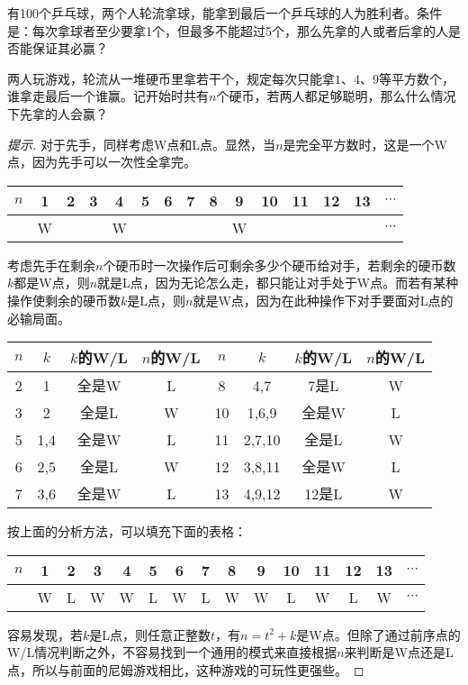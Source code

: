 \begin{question}
  有100个乒乓球，两个人轮流拿球，能拿到最后一个乒乓球的人为胜利者。条件是：每次拿球者至少要拿1个，但最多不能超过5个，那么先拿的人或者后拿的人是否能保证其必赢？
\end{question}

\begin{example}[拿平方数]
  两人玩游戏，轮流从一堆硬币里拿若干个，规定每次只能拿$1$、$4$、$9$等平方数个，谁拿走最后一个谁赢。记开始时共有$n$个硬币，若两人都足够聪明，那么什么情况下先拿的人会赢？
\end{example}
\begin{proof}[提示]
  对于先手，同样考虑W点和L点。显然，当$n$是完全平方数时，这是一个W点，因为先手可以一次性全拿完。
  \begin{center}
    \begin{tabular}{c|cccccccccccccc}
      \toprule
      $n$ & 1 & 2 & 3 & 4 & 5 & 6 & 7 & 8 & 9 & 10 & 11 & 12 & 13 & $\cdots$ \\\hline
          & W &   &   & W &   &   &   &   & W &    &    &    &    & $\cdots$ \\
      \bottomrule
    \end{tabular}
  \end{center}
  考虑先手在剩余$n$个硬币时一次操作后可剩余多少个硬币给对手，若剩余的硬币数$k$都是W点，则$n$就是L点，因为无论怎么走，都只能让对手处于W点。而若有某种操作使剩余的硬币数$k$是L点，则$n$就是W点，因为在此种操作下对手要面对L点的必输局面。
  \begin{center}
    \begin{tabular}{cc|cc||cc|cc}
      \toprule
      $n$ & $k$ & $k$的W/L & $n$的W/L & $n$ & $k$ & $k$的W/L & $n$的W/L\\\hline
      2   & 1   & 全是W    & L        & 8   & 4,7 & 7是L     & W\\
      3   & 2   & 全是L    & W        & 10  & 1,6,9  & 全是W    & L\\
      5   & 1,4 & 全是W    & L        & 11  & 2,7,10 & 全是L    & W\\
      6   & 2,5 & 全是L    & W        & 12  & 3,8,11 & 全是W    & L\\
      7   & 3,6 & 全是W    & L        & 13  & 4,9,12 & 12是L    & W\\
      \bottomrule
    \end{tabular}
  \end{center}
  按上面的分析方法，可以填充下面的表格：
  \begin{center}
    \begin{tabular}{c|cccccccccccccc}
      \toprule
      $n$ & 1 & 2 & 3 & 4 & 5 & 6 & 7 & 8 & 9 & 10 & 11 & 12 & 13 & $\cdots$ \\\hline
          & W & L & W & W & L & W & L & W & W & L  & W  & L  & W  & $\cdots$ \\
      \bottomrule
    \end{tabular}
  \end{center}
  容易发现，若$k$是L点，则任意正整数$t$，有$n=t^2+k$是W点。但除了通过前序点的W/L情况判断之外，不容易找到一个通用的模式来直接根据$n$来判断是W点还是L点，所以与前面的尼姆游戏相比，这种游戏的可玩性更强些。
\end{proof}

